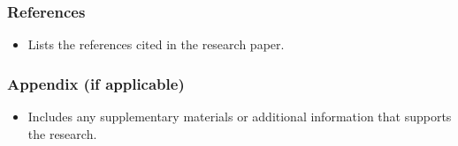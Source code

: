 \documentclass[%
  beameroptions={ignorenonframetext,11pt,169},
  articleoptions={11pt},
  also={trans,handout,article},
  ]{beamerswitch}
\begin{document}
\begin{frame}
  \frametitle{References}
  \setcounter{footnote}{0}
  \setcounter{equation}{0}
  \begin{itemize}
    \item Lists the references cited in the research paper.
  \end{itemize}
\end{frame}

\begin{frame}
  \frametitle{Appendix (if applicable)}
  \setcounter{footnote}{0}
  \setcounter{equation}{0}
  \begin{itemize}
    \item Includes any supplementary materials or additional information that supports the research.
  \end{itemize}
\end{frame}
\end{document}
